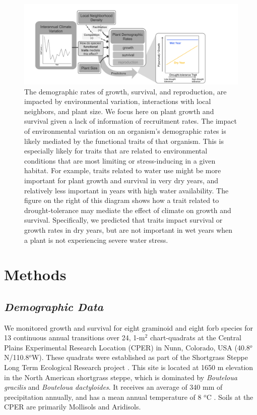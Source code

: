 \documentclass[12pt, letterpaper]{article}
\begin{document}
\begin{figure}
\includegraphics[width=1\textwidth]{CO_sgs_ConceptualFigure.pdf}
\caption{\small{
The demographic rates of growth, survival, and reproduction, are impacted by environmental variation, interactions with local neighbors, and plant size. We focus here on plant growth and survival given a lack of information of recruitment rates. The impact of environmental variation on an organism's demographic rates is likely mediated by the functional traits of that organism. This is especially likely for traits that are related to environmental conditions that are most limiting or stress-inducing in a given habitat. For example, traits related to water use might be more important for plant growth and survival in very dry years, and relatively less important in years with high water availability. The figure on the right of this diagram shows how a trait related to drought-tolerance may mediate the effect of climate on growth and survival. Specifically, we predicted that traits impact survival or growth rates in dry years, but are not important in wet years when a plant is not experiencing severe water stress. 
}}
\label{fig:ConceptFig}
\end{figure}

\section{Methods}
\subsection{\textit{Demographic Data}} We monitored growth and survival for eight graminoid and eight forb species for 13 continuous annual transitions over 24, 1-m$^2$ chart-quadrats at the Central Plains Experimental Research Location (CPER) in Nunn, Colorado, USA (40.8$^o$N/110.8$^o$W). These quadrats were established as part of the Shortgrass Steppe Long Term Ecological Research project \citep{Chu2013}. This site is located at 1650 m elevation in the North American shortgrass steppe, which is dominated by \textit{Bouteloua gracilis} and \textit{Bouteloua dactyloides}. It receives an average of 340 mm of precipitation annually, and has a mean annual temperature of 8 $^o$C \citep{Chu2014}. Soils at the CPER are primarily Mollisols and Aridisols.
\end{document}
